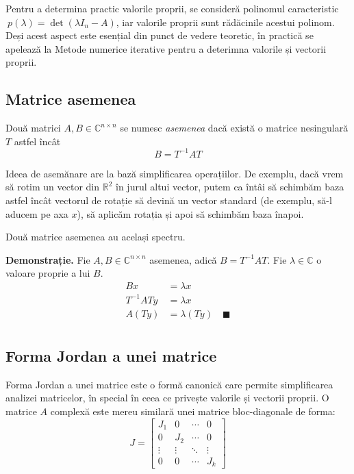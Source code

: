 \documentclass{exam}
\begin{document}
Pentru a determina practic valorile proprii, se consideră polinomul caracteristic
\(\ p(\lambda) = \det(\lambda I_n - A)\),
iar valorile proprii sunt rădăcinile acestui polinom. Deși acest aspect este
esențial din punct de vedere teoretic, în practică se apelează la Metode
numerice iterative pentru a deterimna valorile și vectorii proprii.

\subsection{Matrice asemenea}

Două matrici $A, B \in \mathbb{C}^{n \times n}$ se numesc \textit{asemenea} dacă
există o matrice nesingulară $T$ astfel încât
\begin{equation*}
	B = T^{-1} A T
\end{equation*}

Ideea de asemănare are la bază simplificarea operațiilor. De exemplu, dacă vrem
să rotim un vector din $\mathbb{R}^2$ în jurul altui vector, putem ca întâi să
schimbăm baza astfel încât vectorul de rotație să devină un vector
standard (de exemplu, să-l aducem pe axa $x$), să aplicăm rotația și apoi să
schimbăm baza înapoi.

Două matrice asemenea au același spectru.

\textbf{Demonstrație.} Fie $A, B \in \mathbb{C}^{n \times n}$ asemenea, adică
$B = T^{-1} A T$. Fie $\lambda \in \mathbb{C}$ o valoare proprie a lui $B$.
\begin{align*}
	B x          & = \lambda x                        \\
	T^{-1} A T y & = \lambda x                        \\
	A (T y)      & = \lambda (T y) \quad \blacksquare \\
\end{align*}

\subsection{Forma Jordan a unei matrice}

Forma Jordan a unei matrice este o formă canonică care permite simplificarea
analizei matricelor, în special în ceea ce privește valorile și vectorii proprii.
O matrice $A$ complexă este mereu similară unei matrice bloc-diagonale de forma:
\begin{equation*}
	J = \begin{bmatrix}
		J_1    & 0      & \cdots & 0      \\
		0      & J_2    & \cdots & 0      \\
		\vdots & \vdots & \ddots & \vdots \\
		0      & 0      & \cdots & J_k
	\end{bmatrix}
\end{equation*}
\end{document}
